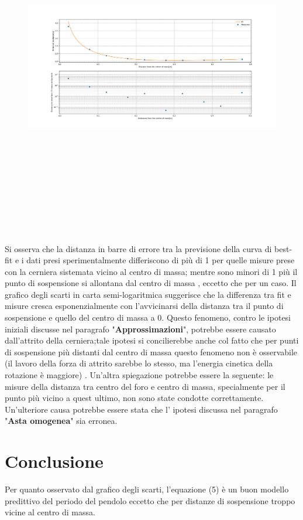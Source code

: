 \documentclass[11pt]{article}
\begin{document}
\begin{figure}[htbp]
\centerline{\includegraphics[width=20cm, height=15cm]{physicalpendulum_plots_1.0.png}}

\label{fig}
\end{figure}
Si osserva che la distanza in barre di errore tra la previsione della curva di best-fit e i dati presi sperimentalmente differiscono di più di 1 per quelle misure prese con la cerniera  sistemata vicino al centro di massa; mentre sono minori di 1 più il punto di sospensione si allontana dal centro di massa , eccetto che per un caso.
Il grafico degli scarti in carta semi-logaritmica suggerisce che la differenza tra fit e misure cresca esponenzialmente con l'avvicinarsi della distanza tra il punto di sospensione e quello del centro di massa a 0.
Questo fenomeno, contro le ipotesi iniziali discusse nel paragrafo "\textbf{Approssimazioni}", potrebbe essere causato dall'attrito della cerniera;tale ipotesi si concilierebbe anche col fatto che per punti di sospensione più distanti dal centro di massa questo fenomeno non è osservabile (il lavoro della forza di attrito sarebbe lo stesso, ma l'energia cinetica della rotazione è maggiore)  . 
Un'altra spiegazione potrebbe essere la seguente: le misure della distanza tra centro del foro e centro di massa, specialmente per il punto più vicino a quest ultimo, non sono state condotte correttamente.
Un'ulteriore causa potrebbe essere stata che l' ipotesi discussa nel paragrafo "\textbf{Asta omogenea}"  sia erronea.
\section{Conclusione}
Per quanto osservato dal grafico degli scarti, l'equazione (5) è un buon modello predittivo del periodo del pendolo eccetto che per distanze di sospensione troppo vicine al centro di massa.
\end{document}
